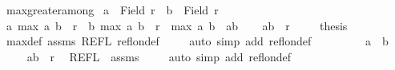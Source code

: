 \begin{isabellebody}
%
\endisadelimdocument
{}\isamarkupfalse%
\ max{}{\isacharunderscore}{\kern0pt}greater{\isacharunderscore}{\kern0pt}among{\isacharcolon}{\kern0pt}\isanewline
{}\ {\isachardoublequoteopen}a\ {\isasymin}\ Field\ r{\isachardoublequoteclose}\ \ {\isachardoublequoteopen}b\ {\isasymin}\ Field\ r{\isachardoublequoteclose}\isanewline
{}\ {\isachardoublequoteopen}{\isacharparenleft}{\kern0pt}a{\isacharcomma}{\kern0pt}\ max{}\ a\ b{\isacharparenright}{\kern0pt}\ {\isasymin}\ r\ {\isasymand}\ {\isacharparenleft}{\kern0pt}b{\isacharcomma}{\kern0pt}\ max{}\ a\ b{\isacharparenright}{\kern0pt}\ {\isasymin}\ r\ {\isasymand}\ max{}\ a\ b\ {\isasymin}\ {\isacharbraceleft}{\kern0pt}a{\isacharcomma}{\kern0pt}b{\isacharbraceright}{\kern0pt}{\isachardoublequoteclose}\isanewline
%
\isadelimproof
%
\endisadelimproof
%
\isatagproof
{}\isamarkupfalse%
{\isacharminus}{\kern0pt}\isanewline
\ \ \isacommand{{\isacharbraceleft}{\kern0pt}}\isamarkupfalse%
\isamarkupfalse%
\ {\isachardoublequoteopen}{\isacharparenleft}{\kern0pt}a{\isacharcomma}{\kern0pt}b{\isacharparenright}{\kern0pt}\ {\isasymin}\ r{\isachardoublequoteclose}\isanewline
\ \ \ \isamarkupfalse%
\ {\isacharquery}{\kern0pt}thesis\ \isamarkupfalse%
\ max{}{\isacharunderscore}{\kern0pt}def\ assms\ REFL\ refl{\isacharunderscore}{\kern0pt}on{\isacharunderscore}{\kern0pt}def\isanewline
\ \ \ \isamarkupfalse%
\ {\isacharparenleft}{\kern0pt}auto\ simp\ add{\isacharcolon}{\kern0pt}\ refl{\isacharunderscore}{\kern0pt}on{\isacharunderscore}{\kern0pt}def{\isacharparenright}{\kern0pt}\isanewline
\ \ \isacommand{{\isacharbraceright}{\kern0pt}}\isamarkupfalse%
\isanewline
\ \ \isamarkupfalse%
\isanewline
\ \ \isacommand{{\isacharbraceleft}{\kern0pt}}\isamarkupfalse%
\isamarkupfalse%
\ {\isachardoublequoteopen}a\ {\isacharequal}{\kern0pt}\ b{\isachardoublequoteclose}\isanewline
\ \ \ \isamarkupfalse%
\ {\isachardoublequoteopen}{\isacharparenleft}{\kern0pt}a{\isacharcomma}{\kern0pt}b{\isacharparenright}{\kern0pt}\ {\isasymin}\ r{\isachardoublequoteclose}\ \isamarkupfalse%
\ REFL\ \ assms\isanewline
\ \ \ \isamarkupfalse%
\ {\isacharparenleft}{\kern0pt}auto\ simp\ add{\isacharcolon}{\kern0pt}\ refl{\isacharunderscore}{\kern0pt}on{\isacharunderscore}{\kern0pt}def{\isacharparenright}{\kern0pt}\isanewline
\ \ \isacommand{{\isacharbraceright}{\kern0pt}}\isamarkupfalse%

\end{isabellebody}
